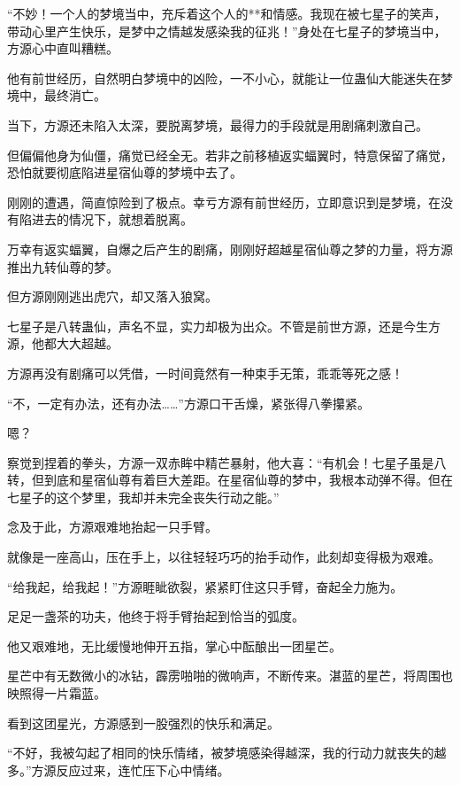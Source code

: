 
\begin{this_body}

“不妙！一个人的梦境当中，充斥着这个人的**和情感。我现在被七星子的笑声，带动心里产生快乐，是梦中之情越发感染我的征兆！”身处在七星子的梦境当中，方源心中直叫糟糕。

他有前世经历，自然明白梦境中的凶险，一不小心，就能让一位蛊仙大能迷失在梦境中，最终消亡。

当下，方源还未陷入太深，要脱离梦境，最得力的手段就是用剧痛刺激自己。

但偏偏他身为仙僵，痛觉已经全无。若非之前移植返实蝠翼时，特意保留了痛觉，恐怕就要彻底陷进星宿仙尊的梦境中去了。

刚刚的遭遇，简直惊险到了极点。幸亏方源有前世经历，立即意识到是梦境，在没有陷进去的情况下，就想着脱离。

万幸有返实蝠翼，自爆之后产生的剧痛，刚刚好超越星宿仙尊之梦的力量，将方源推出九转仙尊的梦。

但方源刚刚逃出虎穴，却又落入狼窝。

七星子是八转蛊仙，声名不显，实力却极为出众。不管是前世方源，还是今生方源，他都大大超越。

方源再没有剧痛可以凭借，一时间竟然有一种束手无策，乖乖等死之感！

“不，一定有办法，还有办法……”方源口干舌燥，紧张得八拳攥紧。

嗯？

察觉到捏着的拳头，方源一双赤眸中精芒暴射，他大喜：“有机会！七星子虽是八转，但到底和星宿仙尊有着巨大差距。在星宿仙尊的梦中，我根本动弹不得。但在七星子的这个梦里，我却并未完全丧失行动之能。”

念及于此，方源艰难地抬起一只手臂。

就像是一座高山，压在手上，以往轻轻巧巧的抬手动作，此刻却变得极为艰难。

“给我起，给我起！”方源睚眦欲裂，紧紧盯住这只手臂，奋起全力施为。

足足一盏茶的功夫，他终于将手臂抬起到恰当的弧度。

他又艰难地，无比缓慢地伸开五指，掌心中酝酿出一团星芒。

星芒中有无数微小的冰钻，霹雳啪啪的微响声，不断传来。湛蓝的星芒，将周围也映照得一片霜蓝。

看到这团星光，方源感到一股强烈的快乐和满足。

“不好，我被勾起了相同的快乐情绪，被梦境感染得越深，我的行动力就丧失的越多。”方源反应过来，连忙压下心中情绪。


\end{this_body}
